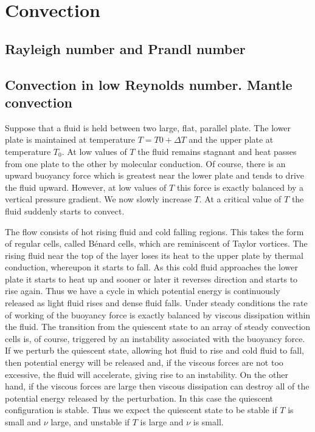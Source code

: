 \section{Convection}


\subsection{Rayleigh number and Prandl number}

\subsection{Convection in low Reynolds number. Mantle convection}

Suppose that a fluid is held between two large, flat, parallel plate.
The lower plate is maintained at temperature $T= T0
+ \Delta T$ and the upper plate
at temperature $T_0$. At low values of $T$ the fluid remains stagnant and
heat passes from one plate to the other by molecular conduction. Of course, there is an upward buoyancy force which is
greatest near the lower plate and tends to drive the fluid upward. However, at low values of $T$
this force is exactly balanced by a vertical pressure gradient. We now slowly increase $T$. At a
critical value of $T$ the fluid suddenly starts to convect. 

The flow consists of hot rising fluid and cold falling regions. This takes the form of regular
cells, called B\'{e}nard cells, which are reminiscent of Taylor
vortices. The rising fluid near the top
of the layer loses its heat to the upper plate by thermal conduction, whereupon it starts to fall.
As this cold fluid approaches the lower plate it starts to heat up and sooner or later it reverses
direction and starts to rise again. Thus we have a cycle in which
potential energy is continuously
released as light fluid rises and dense fluid falls. Under steady conditions the rate of working of
the buoyancy force is exactly balanced by viscous dissipation within
the fluid.
The transition from the quiescent state to an array of steady convection cells is, of course,
triggered by an instability associated with the buoyancy force. If we perturb the quiescent state,
allowing hot fluid to rise and cold fluid to fall, then potential energy will be released and, if the
viscous forces are not too excessive, the fluid will accelerate, giving rise to an instability. On the
other hand, if the viscous forces are large then viscous dissipation
can destroy all of the potential
energy released by the perturbation. In this case the quiescent configuration is stable. Thus we
expect the quiescent state to be stable if $T$ is small and $\nu$ large, and
unstable if $T$ is large and $\nu$ is small.

